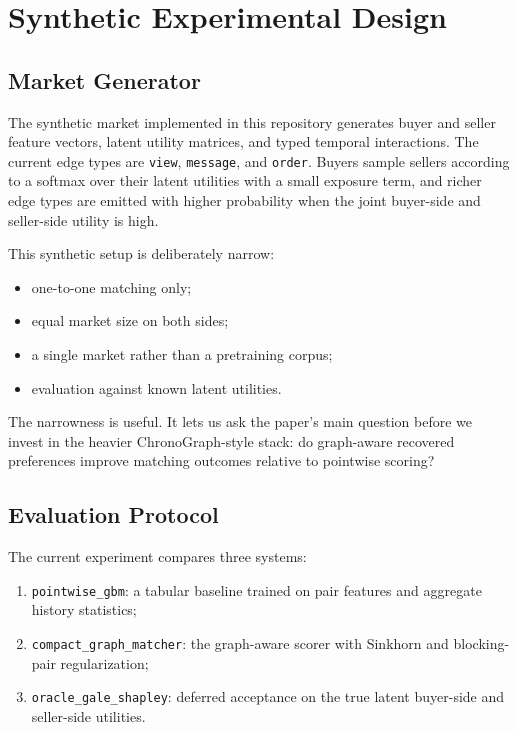 \documentclass[11pt]{article}
\begin{document}
\section{Synthetic Experimental Design}

\subsection{Market Generator}

The synthetic market implemented in this repository generates buyer and seller
feature vectors, latent utility matrices, and typed temporal interactions. The
current edge types are \texttt{view}, \texttt{message}, and \texttt{order}.
Buyers sample sellers according to a softmax over their latent utilities with a
small exposure term, and richer edge types are emitted with higher probability
when the joint buyer-side and seller-side utility is high.

This synthetic setup is deliberately narrow:
\begin{itemize}
  \item one-to-one matching only;
  \item equal market size on both sides;
  \item a single market rather than a pretraining corpus;
  \item evaluation against known latent utilities.
\end{itemize}

The narrowness is useful. It lets us ask the paper's main question before we
invest in the heavier ChronoGraph-style stack: do graph-aware recovered
preferences improve matching outcomes relative to pointwise scoring?

\subsection{Evaluation Protocol}

The current experiment compares three systems:
\begin{enumerate}
  \item \texttt{pointwise\_gbm}: a tabular baseline trained on pair features and
  aggregate history statistics;
  \item \texttt{compact\_graph\_matcher}: the graph-aware scorer with Sinkhorn
  and blocking-pair regularization;
  \item \texttt{oracle\_gale\_shapley}: deferred acceptance on the true latent
  buyer-side and seller-side utilities.
\end{enumerate}
\end{document}
